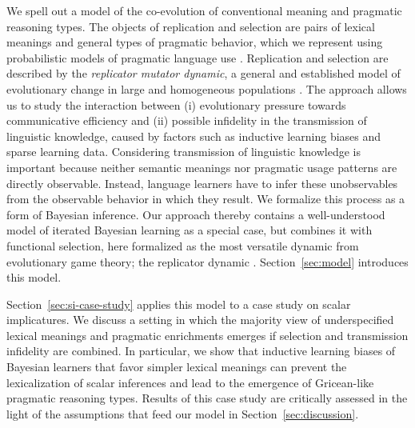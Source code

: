 \documentclass[a4paper, 11pt]{article}
\theoremstyle{Satz}
\begin{document}
We spell out a model of the co-evolution of conventional meaning and pragmatic reasoning
types. The objects of replication and selection are pairs of lexical meanings and general types
of pragmatic behavior, which we represent using probabilistic models of pragmatic language use
\citep{frank+goodman:2012,FrankeJager2015:Probabilistic-p,GoodmanFrank2016:Pragmatic-Langu}. Replication
and selection are described by the \emph{replicator mutator dynamic}, a general and established
model of evolutionary change in large and homogeneous populations
\citep{Hofbauer1985:The-Selection-M,nowak+etal:2000,NowakKomarova2001:Evolution-of-Un,hofbauer+sigmund:2003,Nowak2006:Evolutionary-Dy}. The
approach allows us to study the interaction between (i) evolutionary pressure towards
communicative efficiency and (ii) possible infidelity in the transmission of linguistic
knowledge, caused by factors such as inductive learning biases and sparse learning
data. Considering transmission of linguistic knowledge is important because neither semantic
meanings nor pragmatic usage patterns are directly observable. Instead, language learners have
to infer these unobservables from the observable behavior in which they result. We formalize
this process as a form of Bayesian inference. Our approach thereby contains a well-understood
model of iterated Bayesian learning \citep{griffiths+kalish:2007} as a special case, but
combines it with functional selection, here formalized as the most versatile dynamic from
evolutionary game theory; the replicator dynamic
\citep{TaylorJonker1978:Evolutionary-St}. Section~\ref{sec:model} introduces this model.

Section~\ref{sec:si-case-study} applies this model to a case study on scalar implicatures. We
discuss a setting in which the majority view of underspecified lexical meanings and pragmatic
enrichments emerges if selection and transmission infidelity are combined. In particular, we
show that inductive learning biases of Bayesian learners that favor simpler lexical meanings
can prevent the lexicalization of scalar inferences and lead to the emergence of Gricean-like
pragmatic reasoning types. Results of this case study are critically assessed in the light of
the assumptions that feed our model in Section~\ref{sec:discussion}.

\end{document}
